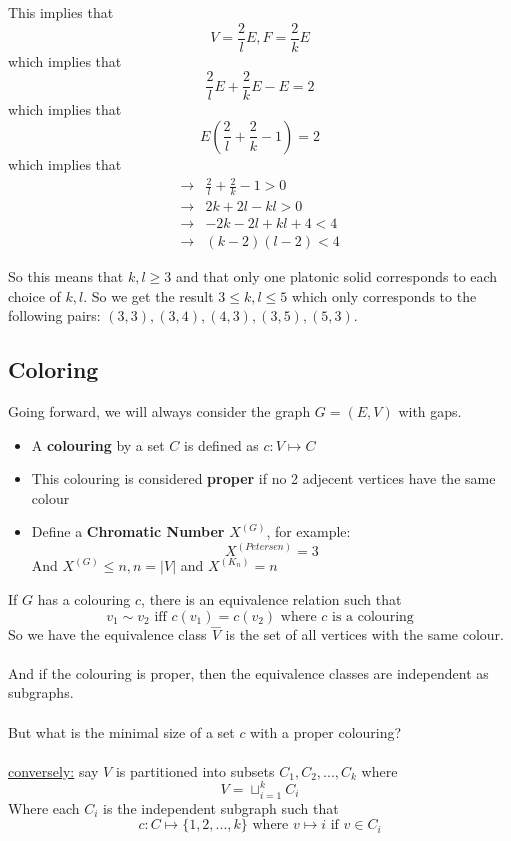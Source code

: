 \documentclass[12pt]{article}
\begin{document}
This implies that $$V = \frac{2}{l} E, F = \frac{2}{k} E$$ which implies that $$\frac{2}{l} E + \frac{2}{k} E - E = 2$$ which implies that $$E(\frac{2}{l} + \frac{2}{k} - 1) = 2$$ which implies that
\begin{align*}
	\longrightarrow& \frac{2}{l} + \frac{2}{k} - 1 > 0\\
	\longrightarrow& 2k +2l - kl > 0\\
	\longrightarrow& -2k -2l  + kl + 4 < 4\\
	\longrightarrow& (k-2)(l-2) < 4
\end{align*}

So this means that $k,l \geq 3$ and that only one platonic solid corresponds to each choice of $k,l$. So we get the result $3 \leq k, l \leq 5$ which only corresponds to the following pairs: $(3,3), (3,4), (4,3), (3,5), (5,3)$.

\subsection{Coloring}

Going forward, we will always consider the graph $G=(E,V)$ with gaps.
\begin{itemize}
	\item{A \textbf{colouring} by a set $C$ is defined as $c:V\mapsto C$}
	\item{This colouring is considered \textbf{proper} if no 2 adjecent vertices have the same colour}
	\item{Define a \textbf{Chromatic Number} $X^{(G)}$, for example: $$X^{(Petersen)}=3$$ And $X^{(G)} \leq n, n=|V|$ and $X^{(K_n)} = n$}
\end{itemize}

If $G$ has a colouring $c$, there is an equivalence relation such that $$v_1 \sim v_2 \text{ iff } c(v_1) = c(v_2) \text{ where } c \text{ is a colouring}$$ So we have the equivalence class $\overset{\_\_\_}{V}$ is the set of all vertices with the same colour.\\
\\
And if the colouring is proper, then the equivalence classes are independent as subgraphs.\\
\\
But what is the minimal size of a set $c$ with a proper colouring?\\
\\
\underline{conversely:} say $V$ is partitioned into subsets $C_1, C_2, ..., C_k$ where $$V=\sqcup^k_{i=1} C_i$$ Where each $C_i$ is the independent subgraph such that $$c:C \mapsto \{ 1,2,...,k \} \text{ where } v\mapsto i \text{ if } v \in C_i$$
\end{document}
